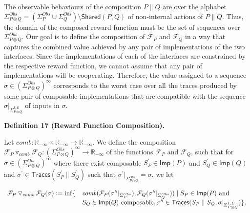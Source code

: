  
 
The observable behaviours of the composition $P\parallel Q$ are over the alphabet $\Sigma_{P\otimes Q}^{Obs}=(\Sigma_{P}^{Obs}\cup\Sigma_{Q}^{Obs})\setminus\mathsf{Shared}(P,Q)$ of non-internal actions of $P\parallel Q$. Thus, the domain of the composed reward function must be the set of sequences over $\Sigma_{P\otimes Q}^{Obs}$. Our goal is to define the composition of $\mathcal{F}_{P}$ and $\mathcal{F}_{Q}$ in a way that captures the combined value achieved by any pair of implementations of the two interfaces. Since the implementations of each of the interfaces are constrained by the respective reward function, we cannot assume that any pair of implementations will be cooperating. Therefore, the value assigned to a sequence $\sigma\in(\Sigma_{P\otimes Q}^{Obs})^{\infty}$ corresponds to the worst case over all the traces produced by some pair of composable implementations that are compatible with the sequence $\sigma|_{\Sigma_{P\otimes Q}^{I,E}}$ of inputs in $\sigma$.\par
 
 
 
\par\medskip\noindent\textbf{Definition 17 (Reward Function Composition).}\par
 
 
Let $\mathit{comb}:\mathbb{R}_{-\infty}\times\mathbb{R}_{-\infty}\to\mathbb{R}_{-\infty}$. We define the composition ${{\mathcal{F}_{P}}\mathbin{\triangledown_{\mathit{comb}}}{\mathcal{F}_{Q}}}:(\Sigma_{P\otimes Q}^{Obs})^{\infty}\to\mathbb{R}_{-\infty}$ of the functions $\mathcal{F}_{P}$ and $\mathcal{F}_{Q}$, such that for $\sigma\in(\Sigma_{P\otimes Q}^{Obs})^{\infty}$ where there exist composable $S_{P}^{\prime}\in\mathsf{Imp}(P)$ and $S_{Q}^{\prime}\in\mathsf{Imp}(Q)$ and $\sigma^{\prime}\in\mathsf{Traces}(S_{P}^{\prime}\parallel S_{Q}^{\prime})$ such that $\sigma^{\prime}|_{\Sigma_{P\otimes Q}^{Obs}}=\sigma$, we let\par
  
\par  \quad  \[\begin{array}[]{ll}{{\mathcal{F}_{P}}\mathbin{\triangledown_{\mathit{comb}}}{\mathcal{F}_{Q}}}(\sigma):=\inf\{&\mathit{comb}(\mathcal{F}_{P}(\sigma^{\prime\prime}|_{\Sigma_{P}^{Obs}}),\mathcal{F}_{Q}(\sigma^{\prime\prime}|_{\Sigma_{Q}^{Obs}}))\mid S_{P}\in\mathsf{Imp}(P)\text{ and }\\
&S_{Q}\in\mathsf{Imp}(Q)\text{ composable},\sigma^{\prime\prime}\in\mathsf{Traces}(S_{P}\parallel S_{Q},\sigma|_{\Sigma_{P\otimes Q}^{I,E}})\},\end{array}\]\quad  \quad  
  
